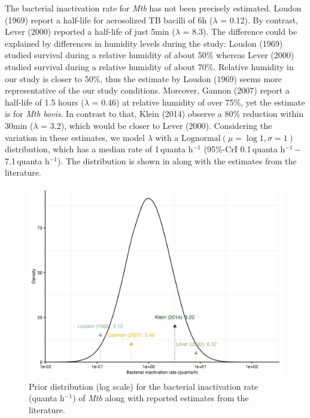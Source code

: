 \documentclass[fleqn,11pt]{wlscirep_supp}
\begin{document}
The bacterial inactivation rate for \emph{Mtb} has not been precisely estimated. Loudon (1969)\cite{Loudon1969AMRRD} report a half-life for aerosolized TB bacilli of 6h ($\lambda$ = 0.12). By contrast, Lever (2000)\cite{Lever2000LettersAppliedMicrobio} reported a half-life of just 5min ($\lambda$ = 8.3). The difference could be explained by differences in humidity levels during the study\cite{Lever2000LettersAppliedMicrobio}: Loudon (1969) studied survival during a relative humidity of about 50\% whereas Lever (2000) studied survival during a relative humidity of about 70\%. Relative humidity in our study is closer to 50\%, thus the estimate by Loudon (1969) seems more representative of the our study conditions.  Moreover, Gannon (2007)\cite{Gannon2007ResVetSci} report a half-life of 1.5 hours ($\lambda$ = 0.46) at relative humidity of over 75\%, yet the estimate is for \emph{Mtb bovis}. In contrast to that, Klein (2014)\cite{Klein2014IJMyco} observe a 80\% reduction within 30min ($\lambda$ = 3.2), which would be closer to Lever (2000). Considering the variation in these estimates, we model $\lambda$ with a $\mathrm{Lognormal}(\mu = \log 1, \sigma = 1)$ distribution, which has a median rate of 1\,quanta h$^{-1}$ (95\%-CrI 0.1\,quanta h$^{-1}$\,$-$\,7.1\,quanta h$^{-1}$). The distribution is shown in  along with the estimates from the literature.

\begin{figure}[!htpb]
    \centering
    \includegraphics{results/inputs/bacterial-inactivation-rate.png}
    \caption{Prior distribution (log scale) for the bacterial inactivation rate (quanta h$^{-1}$) of \emph{Mtb} along with reported estimates from the literature\cite{Loudon1969AMRRD,Gannon2007ResVetSci,Klein2014IJMyco,Lever2000LettersAppliedMicrobio}.}
    \label{fig:lambda-distribution}
\end{figure}
\end{document}
